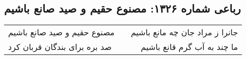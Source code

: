 \begin{center}
\section*{رباعی شماره ۱۳۲۶: مصنوع حقیم و صید صانع باشیم}
\label{sec:1326}
\begin{longtable}{l p{0.5cm} r}
مصنوع حقیم و صید صانع باشیم
&&
جانرا ز مراد جان چه مانع باشیم
\\
صد بره برای بندگان قربان کرد
&&
ما چند به آب گرم قانع باشیم
\\
\end{longtable}
\end{center}
